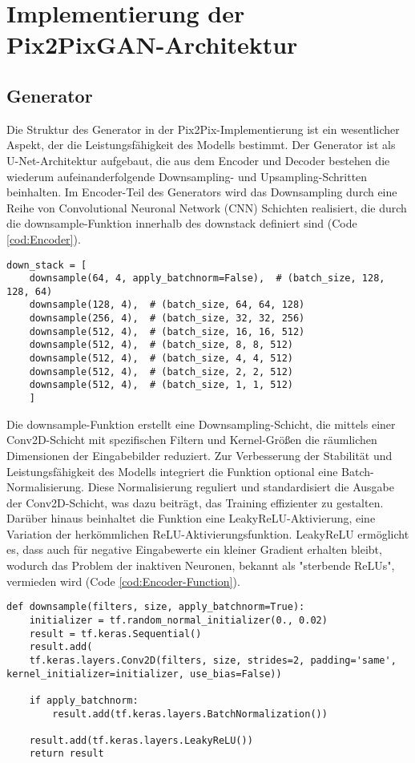 \section{Implementierung der Pix2PixGAN-Architektur}
\subsection{Generator}

Die Struktur des Generator in der Pix2Pix-Implementierung ist ein wesentlicher Aspekt, der die Leistungsfähigkeit des Modells bestimmt. Der Generator ist als U-Net-Architektur aufgebaut, die aus dem Encoder und Decoder bestehen die wiederum  aufeinanderfolgende Downsampling- und Upsampling-Schritten beinhalten.
\newline
Im Encoder-Teil des Generators wird das Downsampling durch eine Reihe von Convolutional Neuronal Network (CNN) Schichten realisiert, die durch die downsample-Funktion innerhalb des downstack definiert sind (Code \ref{cod:Encoder}). 
\begin{lstlisting}[language=pyhaff, caption={Downsampling-Schritt in Pix2Pix}, 		label={cod:Encoder}]
	down_stack = [
	downsample(64, 4, apply_batchnorm=False),  # (batch_size, 128, 128, 64)
	downsample(128, 4),  # (batch_size, 64, 64, 128)
	downsample(256, 4),  # (batch_size, 32, 32, 256)
	downsample(512, 4),  # (batch_size, 16, 16, 512)
	downsample(512, 4),  # (batch_size, 8, 8, 512)
	downsample(512, 4),  # (batch_size, 4, 4, 512)
	downsample(512, 4),  # (batch_size, 2, 2, 512)
	downsample(512, 4),  # (batch_size, 1, 1, 512)
	]
\end{lstlisting}

Die downsample-Funktion erstellt eine Downsampling-Schicht, die mittels einer Conv2D-Schicht mit spezifischen Filtern und Kernel-Größen die räumlichen Dimensionen der Eingabebilder reduziert. Zur Verbesserung der Stabilität und Leistungsfähigkeit des Modells integriert die Funktion optional eine Batch-Normalisierung. Diese Normalisierung reguliert und standardisiert die Ausgabe der Conv2D-Schicht, was dazu beiträgt, das Training effizienter zu gestalten.
Darüber hinaus beinhaltet die Funktion eine LeakyReLU-Aktivierung, eine Variation der herkömmlichen ReLU-Aktivierungsfunktion. LeakyReLU ermöglicht es, dass auch für negative Eingabewerte ein kleiner Gradient erhalten bleibt, wodurch das Problem der inaktiven Neuronen, bekannt als "sterbende ReLUs", vermieden wird (Code \ref{cod:Encoder-Function}).

\begin{lstlisting}[language=pyhaff, caption={Downsampling-Schicht in Pix2Pix}, label={cod:Encoder-Function}]
def downsample(filters, size, apply_batchnorm=True):
	initializer = tf.random_normal_initializer(0., 0.02)
	result = tf.keras.Sequential()
	result.add(
	tf.keras.layers.Conv2D(filters, size, strides=2, padding='same', kernel_initializer=initializer, use_bias=False))
	
	if apply_batchnorm:
		result.add(tf.keras.layers.BatchNormalization())
	
	result.add(tf.keras.layers.LeakyReLU())
	return result
	
\end{lstlisting}


